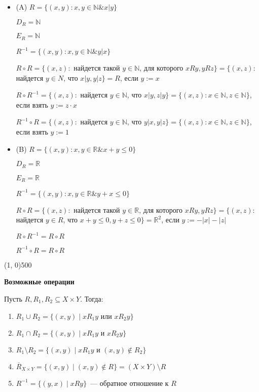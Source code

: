 \documentclass{article}
\begin{document}
\begin{itemize}
    \item (A) $R = \{(x, y): x, y \in \mathbb{N} \& x | y\}$
    
    $D_R = \mathbb{N}$
    
    $E_R = \mathbb{N}$
    
    $R^{-1} = \{(x, y): x, y \in \mathbb{N} \& y | x\}$
    
    $R \circ R = \{(x, z):$ найдется такой $y \in \mathbb{N}$, для которого $xRy, yRz \} = \{(x, z):$ найдется $y \in N$, что $x|y, y|z \} = R$, если $y := x$
    
    $R \circ R^{-1} = \{(x, z):$ найдется $y \in \mathbb{N}$, что $x|y, z|y \} = \{(x, z) : x \in \mathbb{N}, z \in \mathbb{N}\}$, если взять $y := z \cdot x$
    
    $R^{-1} \circ R = \{(x, z):$ найдется $y \in \mathbb{N}$, что $y|x, y|z \} = \{(x, z) : x \in \mathbb{N}, z \in \mathbb{N}\}$, если взять $y := 1$
    
    \item (B) $R = \{(x, y): x, y \in \mathbb{R} \& x + y \le 0 \}$
    
    $D_R = \mathbb{R}$
    
    $E_R = \mathbb{R}$
    
    $R^{-1} = \{(x, y): x, y \in \mathbb{R} \& y + x \le 0\}$
    
    $R \circ R = \{(x, z):$ найдется такой $y \in \mathbb{R}$, для которого $xRy, yRz \} = \{(x, z):$ найдется $y \in R$, что $x + y \le 0, y + z \le 0\} = \mathbb{R}^2$, если $y := -|x| - |z|$
    
    $R \circ R^{-1} = R \circ R$
    
    $R^{-1} \circ R = R \circ R$
    
    
\end{itemize}

\line(1, 0){500}

\textbf{Возможные операции}

Пусть $R, R_1, R_2 \subseteq X \times Y$. Тогда:
\begin{enumerate}
	\item $R_1 \cup R_2 = \{(x, y) \mid xR_1y \text{ или } xR_2y\}$
	\item $R_1 \cap R_2 = \{(x, y) \mid xR_1y \text{ и } xR_2y\}$
	\item $R_1 \setminus R_2 = \{(x, y) \mid xR_1y \text{ и } (x, y) \notin R_2\}$
	\item $\overline{R}_{X \times Y} = \{(x, y) \mid (x, y) \notin R\} = (X \times Y) \setminus R$
	\item $R^{-1} = \{(y, x) \mid xRy\}$~--- обратное отношение к $R$
\end{enumerate}
\end{document}
